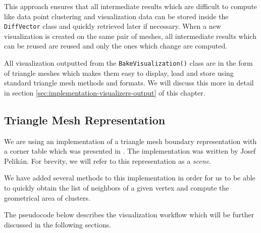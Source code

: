 This approach ensures that all intermediate results which are difficult to compute like data point clustering and visualization data can be stored inside the \verb+DiffVector+ class and quickly retrieved later if necessary. When a new visualization is created on the same pair of meshes, all intermediate results which can be reused are reused and only the ones which change are computed.

All visualization outputted from the \verb+BakeVisualization()+ class are in the form of triangle meshes which makes them easy to display, load and store using standard triangle mesh methods and formats. We will discuss this more in detail in section \ref{sec:implementation-visualizers-output} of this chapter.

\subsection{Triangle Mesh Representation}
\label{sec:mesh_representation}

We are using an implementation of a triangle mesh boundary representation with a corner table which was presented in \citet{Corner03}. The implementation was written by Josef Pelikán. For brevity, we will refer to this representation as a {\it scene}\footnotemark.


We have added several methods to this implementation in order for us to be able to quickly obtain the list of neighbors of a given vertex and compute the geometrical area of clusters.

The pseudocode below describes the visualization workflow which will be further discussed in the following sections.

